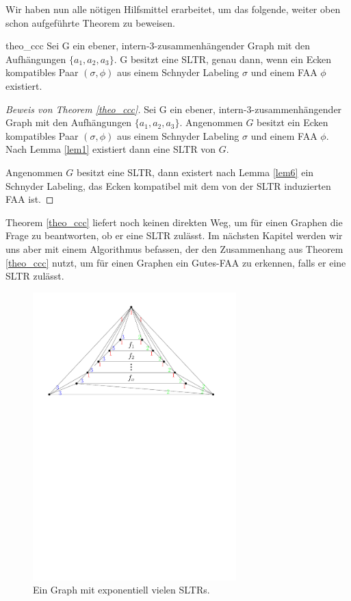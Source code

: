Wir haben nun alle nötigen Hilfsmittel erarbeitet, um das folgende, weiter oben schon aufgeführte Theorem zu beweisen.

\begin{reptheorem}{theo_ccc}
Sei G ein ebener, intern-3-zusammenhängender Graph mit den Aufhängungen $\{a_1,a_2,a_3\}$. G besitzt eine SLTR, genau dann, wenn ein Ecken kompatibles Paar $(\sigma,\phi)$ aus einem Schnyder Labeling $\sigma$ und einem FAA $\phi$ existiert.
\end{reptheorem}

\begin{proof}[Beweis von Theorem \ref{theo_ccc}]
Sei G ein ebener, intern-3-zusammenhängender Graph mit den Aufhängungen $\{a_1,a_2,a_3\}$. Angenommen $G$ besitzt ein Ecken kompatibles Paar $(\sigma,\phi)$ aus einem Schnyder Labeling $\sigma$ und einem FAA $\phi$. Nach Lemma \ref{lem1} existiert dann eine SLTR von $G$. 

Angenommen $G$ besitzt eine SLTR, dann existert nach Lemma \ref{lem6} ein Schnyder Labeling, das Ecken kompatibel mit dem von der SLTR induzierten FAA ist.
\end{proof}

Theorem \ref{theo_ccc} liefert noch keinen direkten Weg, um für einen Graphen die Frage zu beantworten, ob er eine SLTR zulässt. Im nächsten Kapitel werden wir uns aber mit einem Algorithmus befassen, der den Zusammenhang aus Theorem \ref{theo_ccc} nutzt, um für einen Graphen ein Gutes-FAA zu erkennen, falls er eine SLTR zulässt.

\begin{figure}[h]
	\centering
  \includegraphics[width=0.7\textwidth]{exp_many_sltr.pdf}
  \caption{Ein Graph mit exponentiell vielen SLTRs.}
  \label{exp_many_sltr}
\end{figure}

